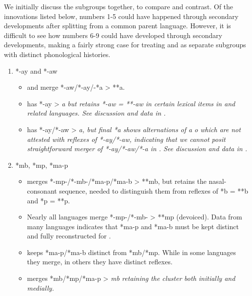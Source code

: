 We initially discuss the subgroups together,
to compare and contrast.
Of the innovations listed below,
numbers 1-5 could have happened through secondary developments
after splitting from a common parent language.
However, it is difficult to see how numbers 6-9 could have developed
through secondary developments, making a fairly strong case for treating 
and  as separate subgroups with distinct phonological
histories.

\begin{enumerate}
	\item	*-ay and *-aw
		\begin{itemize}[topsep=0pt,leftmargin=\dimexpr 15pt-6pt]	
			\item	{}
						and  merge *-aw/*-ay/-*a > **a.
			\item	{} has *-ay > \it{a} but retains *-aw = **-aw
						in certain lexical items in  and related languages.
						See discussion and data in .
			\item	{} has *-ay/*-aw > \it{a,} but final *a shows alternations
						of \it{a {\tl} o} which are not attested with reflexes of *-ay/*-aw,
						indicating that we cannot posit straightforward merger of *-ay/*-aw/*-a in .
						See  discussion
						and data in .
		\end{itemize}
	\item	*mb, *mp, *ma-p
		\begin{itemize}[topsep=0pt,leftmargin=\dimexpr 15pt-6pt]
			\item	{} merges *-mp-/*-mb-/*ma-p/*ma-b > **mb,
						but retains the nasal-consonant sequence,
						needed to distinguish them from reflexes of *b = **b
						and *p = **p.
			\item	Nearly all  languages merge *-mp-/*-mb- > **mp (devoiced).
						Data from many languages indicates that *ma-p
						and *ma-b must be kept distinct
						and fully reconstructed for .
			\item	{} keeps *ma-p/*ma-b distinct from *mb/*mp.
						While in some languages they merge,
						in others they have distinct reflexes.
			\item	{} merges *mb/*mp/*ma-p > \it{mb} retaining the cluster
						both initially and medially. 
		\end{itemize}

\end{enumerate}
